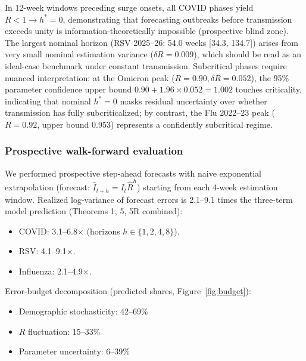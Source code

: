 \documentclass[review]{elsarticle}
\theoremstyle{plain}
\theoremstyle{definition}
\begin{document}
In 12-week windows preceding surge onsets, all COVID phases yield $R<1 \to h^*=0$, demonstrating that forecasting outbreaks before transmission exceeds unity is information-theoretically impossible (prospective blind zone). The largest nominal horizon (RSV 2025--26: 54.0 weeks [34.3, 134.7]) arises from very small nominal estimation variance ($\delta R = 0.009$), which should be read as an ideal-case benchmark under constant transmission. Subcritical phases require nuanced interpretation: at the Omicron peak ($R=0.90, \delta R=0.052$), the 95\% parameter confidence upper bound $0.90 + 1.96 \times 0.052 = 1.002$ touches criticality, indicating that nominal $h^*=0$ masks residual uncertainty over whether transmission has fully subcriticalized; by contrast, the Flu 2022--23 peak ($R=0.92$, upper bound 0.953) represents a confidently subcritical regime.

\subsubsection{Prospective walk-forward evaluation}

We performed prospective step-ahead forecasts with naive exponential extrapolation (forecast: $\hat{I}_{t+h} = I_t \hat{R}^h$) starting from each 4-week estimation window. Realized log-variance of forecast errors is 2.1--9.1 times the three-term model prediction (Theorems 1, 5, 5R combined):
\begin{itemize}
\item COVID: 3.1--6.8$\times$ (horizons $h \in \{1,2,4,8\}$).
\item RSV: 4.1--9.1$\times$.
\item Influenza: 2.1--4.9$\times$.
\end{itemize}

Error-budget decomposition (predicted shares, Figure~\ref{fig:budget}):
\begin{itemize}
\item Demographic stochasticity: 42--69\%
\item $R$ fluctuation: 15--33\%
\item Parameter uncertainty: 6--39\%
\end{itemize}
\end{document}
